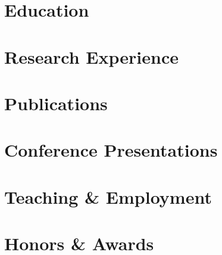 \documentclass{cv}
\begin{document}

    \section{Education}
        
    
    \vspace*{0.25cm}

    \section{Research Experience}
        
        \vspace*{0.1cm}
        
        \vspace*{0.1cm}
        
    
    \vspace*{0.25cm}
    
    \section{Publications}
        
        \vspace*{-0.25cm}

    \section{Conference Presentations}
        
    
    \newpage

    \section{Teaching \& Employment}
        
        
    
    \vspace*{0.25cm}

    \section{Honors \& Awards}
        
        
        \vspace*{0.1cm}
        
        \vspace*{0.1cm}
        
\end{document}
